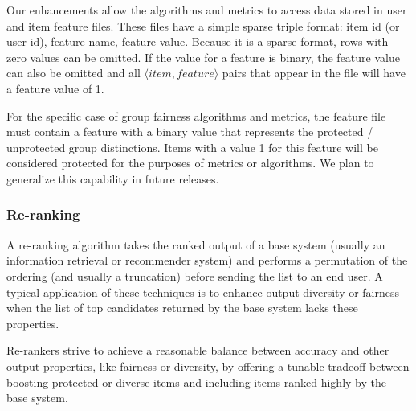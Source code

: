 Our enhancements allow the algorithms and metrics to access data stored in user and item feature files. These files have a simple sparse triple format: item id (or user id), feature name, feature value. Because it is a sparse format, rows with zero values can be omitted. If the value for a feature is binary, the feature value can also be omitted and all $ \langle item, feature \rangle$ pairs that appear in the file will have a feature value of 1.

For the specific case of group fairness algorithms and metrics, the feature file must contain a feature with a binary value that represents the protected / unprotected group distinctions. Items with a value 1 for this feature will be considered protected for the purposes of metrics or algorithms. We plan to generalize this capability in future releases.

\subsubsection{Re-ranking}
\label{subsubsec:libauto_rerank}

A re-ranking algorithm takes the ranked output of a base system (usually an information retrieval or recommender system) and performs a permutation of the ordering (and usually a truncation) before sending the list to an end user. A typical application of these techniques is to enhance output diversity or fairness when the list of top candidates returned by the base system lacks these properties.

Re-rankers strive to achieve a reasonable balance between accuracy and other output properties, like fairness or diversity, by offering a tunable tradeoff between boosting protected or diverse items and including items ranked highly by the base system. 

